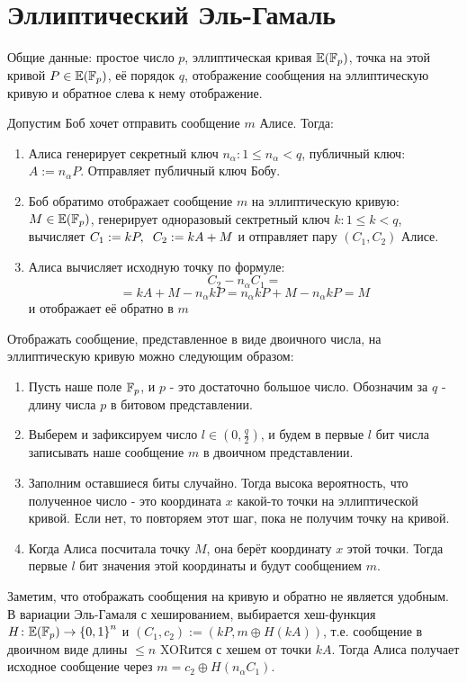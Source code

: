 
\section{Эллиптический Эль-Гамаль}
Общие данные: простое число $p$, эллиптическая кривая $\mathbb E(\mathbb F_p)$, точка на этой кривой $P\in\mathbb E(\mathbb F_p)$, её порядок $q$, отображение сообщения на эллиптическую кривую и обратное слева к нему отображение.

  Допустим Боб хочет отправить сообщение $m$ Алисе. Тогда:
  \begin{enumerate}
    \item Алиса генерирует секретный ключ $n_\alpha\colon 1\leqslant n_\alpha<q$, публичный ключ: $A:=n_\alpha P$. Отправляет публичный ключ Бобу.
    \item Боб обратимо отображает сообщение $m$ на эллиптическую кривую: $M\in\mathbb E(\mathbb F_p)$, генерирует одноразовый сектретный ключ $k\colon 1\leqslant k<q$, вычисляет $C_1:=kP,\hspace{0.2cm} C_2:=kA+M$ и отправляет пару $(C_1,C_2)$ Алисе.
    \item Алиса вычисляет исходную точку по формуле:
    \[C_2 - n_\alpha C_1 =\]\[= kA+M - n_\alpha k P = n_\alpha k P + M - n_\alpha k P = M\]
    и отображает её обратно в $m$ 
  \end{enumerate}
  
  Отображать сообщение, представленное в виде двоичного числа, на эллиптическую кривую можно следующим образом:
  \begin{enumerate}
    \item Пусть наше поле $\mathbb F_p$, и $p$ - это достаточно большое число. Обозначим за $q$ - длину числа $p$ в битовом представлении.
    \item Выберем и зафиксируем число $l\in (0, \frac{q}{2})$, и будем в первые $l$ бит числа записывать наше сообщение $m$ в двоичном представлении.
    \item Заполним оставшиеся биты случайно. Тогда высока вероятность, что полученное число - это координата $x$ какой-то точки на эллиптической кривой. Если нет, то повторяем этот шаг, пока не получим точку на кривой.
    \item Когда Алиса посчитала точку $M$, она берёт координату $x$ этой точки. Тогда первые $l$ бит значения этой координаты и будут сообщением $m$. 
  \end{enumerate}

  Заметим, что отображать сообщения на кривую и обратно не является удобным. В вариации Эль-Гамаля с хешированием, выбирается хеш-функция $H\colon \mathbb E(\mathbb F_p)\to \left\{0,1\right\}^n$ и $(C_1,c_2) := (kP, m \oplus H(kA))$, т.е. сообщение в двоичном виде длины $\leqslant n$ XORится с хешем от точки $kA$. Тогда Алиса получает исходное сообщение через $m = c_2 \oplus H(n_\alpha C_1)$.

